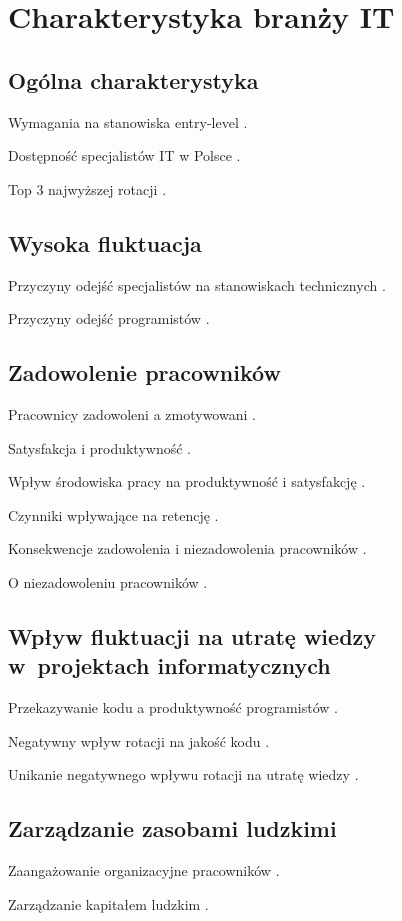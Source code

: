 \chapter{Charakterystyka branży IT}\label{ch:it-sector}
\section{Ogólna charakterystyka}\label{sec:it-industry-summary}
Wymagania na stanowiska entry-level \cite{aasheim-2009}.

Dostępność specjalistów IT w Polsce \cite{prodata-2020}.

Top 3 najwyższej rotacji \cite{linkedin-2018}.

\section{Wysoka fluktuacja}\label{sec:it-turnover}

Przyczyny odejść specjalistów na stanowiskach technicznych \cite{kapor-2017}.

Przyczyny odejść programistów \cite{hannon-2008}.

\section{Zadowolenie pracowników}\label{sec:it-motivation}
Pracownicy zadowoleni a zmotywowani \cite{sharp-2014}.

Satysfakcja i produktywność \cite{storey-2021}.

Wpływ środowiska pracy na produktywność i satysfakcję \cite{johnson-2021}.

Czynniki wpływające na retencję \cite{bass-2018}.

Konsekwencje zadowolenia i niezadowolenia pracowników \cite{graziotin-2018}.

O niezadowoleniu pracowników \cite{graziotin-2017}.


\section{Wpływ fluktuacji na utratę wiedzy w~projektach informatycznych}\label{sec:it-knowledge-loss}

Przekazywanie kodu a produktywność programistów \cite{mockus-2009}.

Negatywny wpływ rotacji na jakość kodu \cite{donadelli-2015}.

Unikanie negatywnego wpływu rotacji na utratę wiedzy \cite{rigby-2016}.

\section{Zarządzanie zasobami ludzkimi}\label{sec:it-project-management}

Zaangażowanie organizacyjne pracowników \cite{rosinski-2012}.

Zarządzanie kapitałem ludzkim \cite{brylka-2019}.

\thispagestyle{normal}
